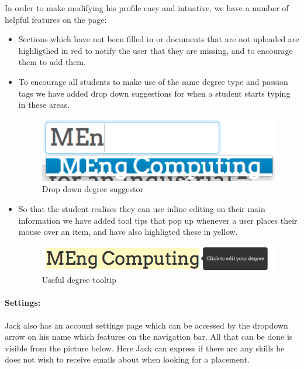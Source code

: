     In order to make modifying his profile easy and intuative, we have a number of helpful features on the page:
    \begin{itemize}
      \item Sections which have not been filled in or documents that are not uploaded are highligthed in red to notify the user that they are missing, and to encourage them to add them.
      \item To encourage all students to make use of the same degree type and passion tags we have added drop down suggestions for when a student starts typing in these areas.

      \begin{figure}[H]\centering
      \includegraphics[scale=0.5]{images/user_experiences/student/edit_suggestions}
      \caption{Drop down degree suggestor}
      \end{figure}
      \item So that the student realises they can use inline editing on their main information we have added tool tips that pop up whenever a user places their mouse over an item, and have also highligted these in yellow.
      
      \begin{figure}[H]\centering
      \includegraphics[scale=0.5]{images/user_experiences/student/edit_degree_tooltip}
      \caption{Useful degree tooltip}
      \end{figure}
    \end{itemize} 

  \paragraph{Settings:}
    Jack also has an account settings page which can be accessed by the dropdown arrow on his name which features on the navigation bar. All that can be done is visible from the picture below. Here Jack can express if there are any skills he does not wish to receive emails about when looking for a placement.

